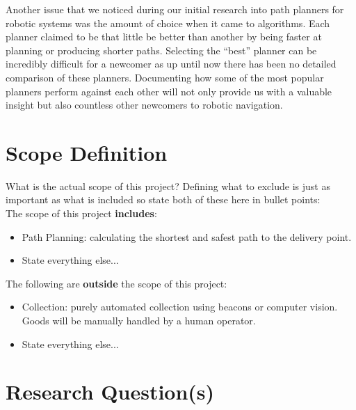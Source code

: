\noindent
Another issue that we noticed during our initial research into path planners for robotic systems was the amount of choice when it came to algorithms. Each planner claimed to be that little be better than another by being faster at planning or producing shorter paths. Selecting the ``best'' planner can be incredibly difficult for a newcomer as up until now there has been no detailed comparison of these planners. Documenting how some of the most popular planners perform against each other will not only provide us with a valuable insight but also countless other newcomers to robotic navigation. 

\newpage


\section{Scope Definition}

\noindent
What is the actual scope of this project? Defining what to exclude is just as important as what is included so state both of these here in bullet points:\\

\noindent
The scope of this project \textbf{includes}:
\begin{itemize}
\item Path Planning: calculating the shortest and safest path to the delivery point.

\item State everything else...
\end{itemize}

\noindent
The following are \textbf{outside} the scope of this project:
\begin{itemize}
\item Collection: purely automated collection using beacons or computer vision. Goods will be manually handled by a human operator.

\item State everything else...
\end{itemize}

\newpage


\section{Research Question(s)}


